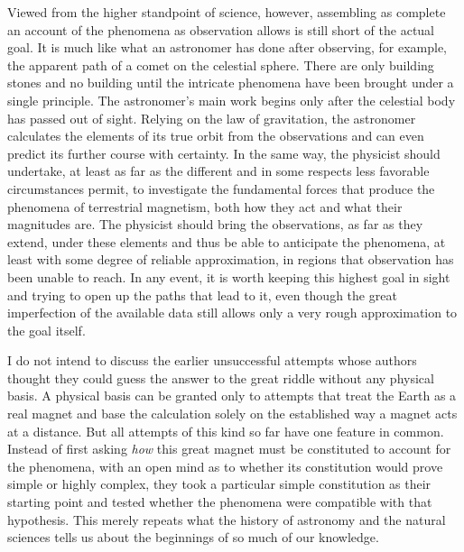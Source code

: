 Viewed from the higher standpoint of science, however, assembling as complete an account of the phenomena as observation allows is still short of the actual goal. It is much like what an astronomer has done after observing, for example, the apparent path of a comet on the celestial sphere. There are only building stones and no building until the intricate phenomena have been brought under a single principle. The astronomer's main work begins only after the celestial body has passed out of sight. Relying on the law of gravitation, the astronomer calculates the elements of its true orbit from the observations and can even predict its further course with certainty. In the same way, the physicist should undertake, at least as far as the different and in some respects less favorable circumstances permit, to investigate the fundamental forces that produce the phenomena of terrestrial magnetism, both how they act and what their magnitudes are. The physicist should bring the observations, as far as they extend, under these elements and thus be able to anticipate the phenomena, at least with some degree of reliable approximation, in regions that observation has been unable to reach. In any event, it is worth keeping this highest goal in sight and trying to open up the paths that lead to it, even though the great imperfection of the available data still allows only a very rough approximation to the goal itself.

I do not intend to discuss the earlier unsuccessful attempts whose authors thought they could guess the answer to the great riddle without any physical basis. A physical basis can be granted only to attempts that treat the Earth as a real magnet and base the calculation solely on the established way a magnet acts at a distance. But all attempts of this kind so far have one feature in common. Instead of first asking \textit{how} this great magnet must be constituted to account for the phenomena, with an open mind as to whether its constitution would prove simple or highly complex, they took a particular simple constitution as their starting point and tested whether the phenomena were compatible with that hypothesis. This merely repeats what the history of astronomy and the natural sciences tells us about the beginnings of so much of our knowledge.

